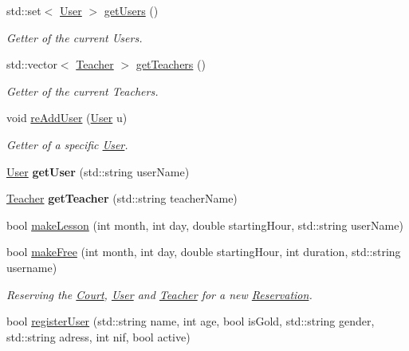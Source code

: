 \begin{DoxyCompactItemize}
std\+::set$<$ \mbox{\hyperlink{class_user}{User}} $>$ \mbox{\hyperlink{class_company_a06704156dc1962518149b2307e448691}{get\+Users}} ()
\begin{DoxyCompactList}\small\item\em Getter of the current Users. \end{DoxyCompactList}\item 
std\+::vector$<$ \mbox{\hyperlink{class_teacher}{Teacher}} $>$ \mbox{\hyperlink{class_company_a000159ce012318a6edf0335447ad8bde}{get\+Teachers}} ()
\begin{DoxyCompactList}\small\item\em Getter of the current Teachers. \end{DoxyCompactList}\item 
void \mbox{\hyperlink{class_company_acbd7b1d6be4ae5e3322add41e2be256e}{re\+Add\+User}} (\mbox{\hyperlink{class_user}{User}} u)
\begin{DoxyCompactList}\small\item\em Getter of a specific \mbox{\hyperlink{class_user}{User}}. \end{DoxyCompactList}\item 
\mbox{\label{class_company_a1f222b5e97b060c0603c42e64d7567a6}} 
\mbox{\hyperlink{class_user}{User}} {\bfseries get\+User} (std\+::string user\+Name)
\item 
\mbox{\label{class_company_a166411c9ee427d89abd9349191434fbf}} 
\mbox{\hyperlink{class_teacher}{Teacher}} {\bfseries get\+Teacher} (std\+::string teacher\+Name)
\item 
bool \mbox{\hyperlink{class_company_a88745d2eaf511e686eccfa14601a302b}{make\+Lesson}} (int month, int day, double starting\+Hour, std\+::string user\+Name)
\item 
bool \mbox{\hyperlink{class_company_a56fa75dd66690eae0853a3f3278220e3}{make\+Free}} (int month, int day, double starting\+Hour, int duration, std\+::string username)
\begin{DoxyCompactList}\small\item\em Reserving the \mbox{\hyperlink{class_court}{Court}}, \mbox{\hyperlink{class_user}{User}} and \mbox{\hyperlink{class_teacher}{Teacher}} for a new \mbox{\hyperlink{class_reservation}{Reservation}}. \end{DoxyCompactList}\item 
bool \mbox{\hyperlink{class_company_af58211dba6c7fa61b81648145dbb165e}{register\+User}} (std\+::string name, int age, bool is\+Gold, std\+::string gender, std\+::string adress, int nif, bool active)

\end{DoxyCompactItemize}
